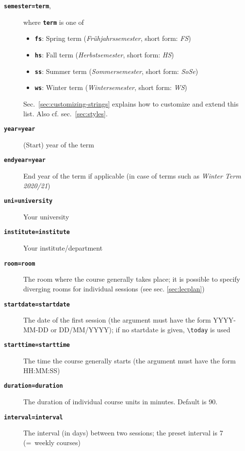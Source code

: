 \documentclass[english]{article}
\newcommand*\joption[1]{\textbf{\texttt{#1}}}
\newcommand*\jfmacro[1]{\texttt{#1}}
\newcommand*\jfcsmacro[1]{\jfmacro{\textbackslash{#1}}}
\newcommand*\jparam[1]{\angus #1\angud}
\begin{document}
\begin{description}
\item [\joption{semester=\jparam{term}},] where \joption{\jparam{term}} is one of

\begin{itemize}
\item \joption{fs}: Spring term (\emph{Frühjahrssemester}, short form: \emph{FS})
\item \joption{hs}: Fall term (\emph{Herbstsemester}, short form: \emph{HS})
\item \joption{ss}: Summer term (\emph{Sommersemester}, short form: \emph{SoSe})
\item \joption{ws}: Winter term (\emph{Wintersemester}, short form: \emph{WS})
\end{itemize}
Sec.~\ref{sec:customizing-strings} explains how to customize and extend this list.
Also cf. sec.~\ref{sec:styles}.

\item [\joption{year=\jparam{year}}] (Start) year of the term
\item [\joption{endyear=\jparam{year}}] End year of the term if applicable (in case of terms such as \emph{Winter Term 2020/21})
\item [\joption{uni=\jparam{university}}] Your university
\item [\joption{institute=\jparam{institute}}] Your institute/department
\item [\joption{room=\jparam{room}}] The room where the course generally takes place;
      it is possible to specify diverging rooms for individual sessions
      (see sec. \ref{sec:lecplan})
\item [\joption{startdate=\jparam{startdate}}] The date of the first session (the argument
       must have the form YYYY-MM-DD or DD/MM/YYYY); if no startdate is given,
      \jfcsmacro{today} is used
\item [\joption{starttime=\jparam{starttime}}] The time the course generally starts (the argument
      must have the form HH:MM:SS)
\item [\joption{duration=\jparam{duration}}] The duration of individual course units in minutes.
      Default is 90.
\item [\joption{interval=\jparam{interval}}] The interval (in days) between two sessions;
      the preset interval is 7 (=~weekly courses)
\end{description}
\end{document}
